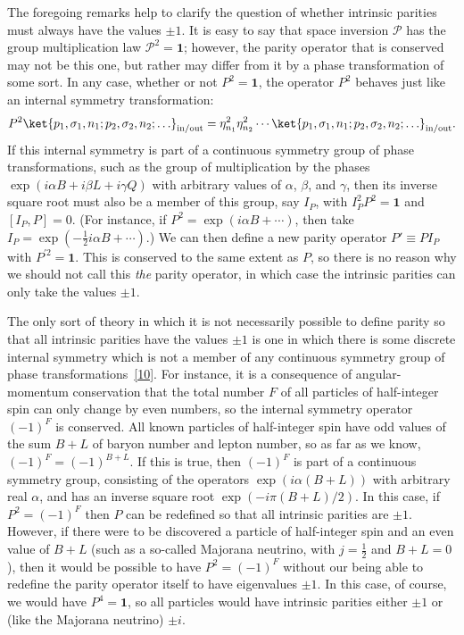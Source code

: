 The foregoing remarks help to clarify the question of whether intrinsic parities
must always have the values $\pm1$. It is easy to say that space inversion
$\mathcal{P}$ has the group multiplication law $\mathcal{P}^2=\mathbf{1}$; however,
the parity operator that is conserved may not be this one, but rather may differ
from it by a phase transformation of some sort. In any case, whether or not
$P^2=\mathbf{1}$, the operator $P^2$ behaves just like an internal symmetry
transformation:
\[
P^2\ket{p_1,\sigma_1,n_1;p_2,\sigma_2,n_2;\ldots}_{\mathrm{in/out}}
=\eta_{n_1}^2\eta_{n_2}^2\cdots
\ket{p_1,\sigma_1,n_1;p_2,\sigma_2,n_2;\ldots}_{\mathrm{in/out}}.
\]
If this internal symmetry is part of a continuous symmetry group of phase
transformations, such as the group of multiplication by the phases
$\exp(i\alpha B+i\beta L+i\gamma Q)$ with arbitrary values of $\alpha$, $\beta$,
and $\gamma$, then its inverse square root must also be a member of this group, say
$I_P$, with $I_P^2P^2=\mathbf{1}$ and $[I_P,P]=0$. (For instance, if
$P^2=\exp(i\alpha B+\cdots)$, then take
$I_P=\exp(-\tfrac12i\alpha B+\cdots)$.) We can then define a new parity operator
$P'\equiv PI_P$ with $P^{\prime2}=\mathbf{1}$. This is conserved to the same extent
as $P$, so there is no reason why we should not call this \textit{the} parity
operator, in which case the intrinsic parities can only take the values $\pm1$.

The only sort of theory in which it is not necessarily possible to define parity so
that all intrinsic parities have the values $\pm1$ is one in which there is some
discrete internal symmetry which is not a member of any continuous symmetry group
of phase transformations~\hyperref[ref:3.10]{[10]}. For instance, it is a consequence of
angular-momentum conservation that the total number $F$ of all particles of
half-integer spin can only change by even numbers, so the internal symmetry operator
$(-1)^F$ is conserved. All known particles of half-integer spin have odd values of
the sum $B+L$ of baryon number and lepton number, so as far as we know,
$(-1)^F=(-1)^{B+L}$. If this is true, then $(-1)^F$ is part of a continuous symmetry
group, consisting of the operators $\exp(i\alpha(B+L))$ with arbitrary real
$\alpha$, and has an inverse square root $\exp(-i\pi(B+L)/2)$. In this case, if
$P^2=(-1)^F$ then $P$ can be redefined so that all intrinsic parities are $\pm1$.
However, if there were to be discovered a particle of half-integer spin and an even
value of $B+L$ (such as a so-called Majorana neutrino, with $j=\tfrac12$ and
$B+L=0$), then it would be possible to have $P^2=(-1)^F$ without our being able to
redefine the parity operator itself to have eigenvalues $\pm1$. In this case, of
course, we would have $P^4=\mathbf{1}$, so all particles would have intrinsic
parities either $\pm1$ or (like the Majorana neutrino) $\pm i$.

